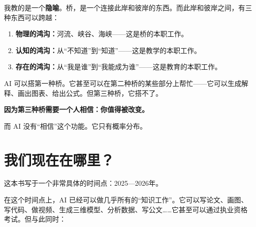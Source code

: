 我教的是一个\textbf{隐喻}。桥，是一个连接此岸和彼岸的东西。而此岸和彼岸之间，有三种东西可以跨越：

\begin{enumerate}
  \item \textbf{物理的鸿沟：}河流、峡谷、海峡——这是桥的本职工作。
  \item \textbf{认知的鸿沟：}从“不知道”到“知道”——这是教学的本职工作。
  \item \textbf{存在的鸿沟：}从“我是谁”到“我能成为谁”——这是教育的本职工作。
\end{enumerate}

AI 可以搭第一种桥。它甚至可以在第二种桥的某些部分上帮忙——它可以生成解释、画出图表、给出公式。但第三种桥，它搭不了。

\textbf{因为第三种桥需要一个人相信：你值得被改变。}

而 AI 没有“相信”这个功能。它只有概率分布。

\vspace{0.5cm}

\begin{center}
\end{center}

\vspace{0.5cm}

\section{我们现在在哪里？}

这本书写于一个非常具体的时间点：2025—2026年。

在这个时间点上，AI 已经可以做几乎所有的“知识工作”。它可以写论文、画图、写代码、做视频、生成三维模型、分析数据、写公文\ldots\ldots 它甚至可以通过执业资格考试。但与此同时：

